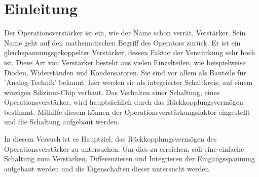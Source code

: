 \chapter{Einleitung}
Der Operationsverstärker ist ein, wie der Name schon verrät, Verstärker. Sein Name geht auf den mathematischen Begriff des Operators zurück. Er ist ein gleichspannungsgekoppelter Verstärker, dessen Faktor der Verstärkung sehr hoch ist. 
Diese Art von Verstärker besteht aus vielen Einzelteilen, wie beispielweise Dioden, Widerständen und Kondensatoren. Sie sind vor allem als Bauteile für 'Analog-Technik' bekannt, hier werden sie als integrierter Schaltkreis, auf einem winzigen Silizium-Chip verbaut. 
Das Verhalten einer Schaltung, eines Operationsverstärker, wird hauptsächlich durch das Rückkopplungsvermögen bestimmt. Mithilfe diesem können der Operationsverstärkungsfaktor eingestellt und die Schaltung aufgebaut werden.

In diesem Versuch ist es Hauptziel, das Rückkopplungsvermögen des Operationsverstärker zu untersuchen. Um dies zu erreichen, soll eine einfache Schaltung zum Verstärken, Differenzieren und Integrieren der Eingangsspannung aufgebaut werden und die Eigenschaften dieser untersucht werden.